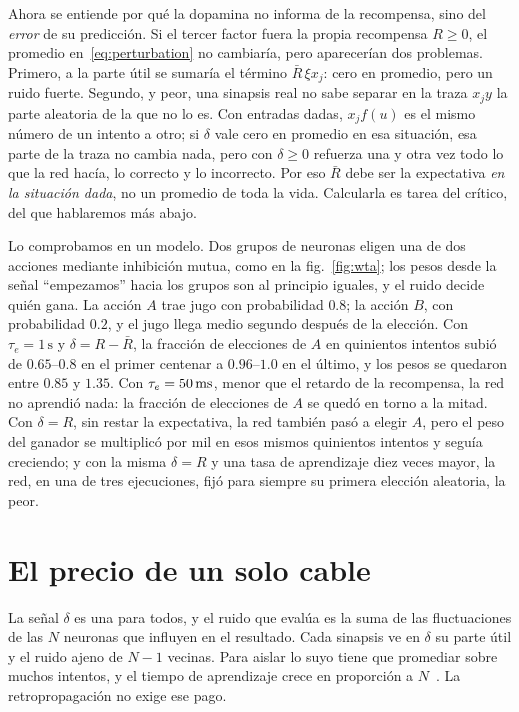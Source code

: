 Ahora se entiende por qué la dopamina no informa de la recompensa, sino del \emph{error} de su predicción. Si el tercer factor fuera la propia recompensa $R\ge0$, el promedio en~\eqref{eq:perturbation} no cambiaría, pero aparecerían dos problemas. Primero, a la parte útil se sumaría el término $\bar R\,\xi x_j$: cero en promedio, pero un ruido fuerte. Segundo, y peor, una sinapsis real no sabe separar en la traza $x_jy$ la parte aleatoria de la que no lo es. Con entradas dadas, $x_jf(u)$ es el mismo número de un intento a otro; si $\delta$ vale cero en promedio en esa situación, esa parte de la traza no cambia nada, pero con $\delta\ge0$ refuerza una y otra vez todo lo que la red hacía, lo correcto y lo incorrecto. Por eso $\bar R$ debe ser la expectativa \emph{en la situación dada}, no un promedio de toda la vida. Calcularla es tarea del crítico, del que hablaremos más abajo.

Lo comprobamos en un modelo. Dos grupos de neuronas  eligen una de dos acciones mediante inhibición mutua, como en la fig.~\ref{fig:wta}; los pesos desde la señal “empezamos” hacia los grupos son al principio iguales, y el ruido decide quién gana. La acción $A$ trae jugo con probabilidad $0.8$; la acción $B$, con probabilidad $0.2$, y el jugo llega medio segundo después de la elección. Con $\tau_e=1\,\text{s}$ y $\delta=R-\bar R$, la fracción de elecciones de $A$ en quinientos intentos subió de $0.65$--$0.8$ en el primer centenar a $0.96$--$1.0$ en el último, y los pesos se quedaron entre $0.85$ y $1.35$. Con $\tau_e=50\,\text{ms}$, menor que el retardo de la recompensa, la red no aprendió nada: la fracción de elecciones de $A$ se quedó en torno a la mitad. Con $\delta=R$, sin restar la expectativa, la red también pasó a elegir $A$, pero el peso del ganador se multiplicó por mil en esos mismos quinientos intentos y seguía creciendo; y con la misma $\delta=R$ y una tasa de aprendizaje diez veces mayor, la red, en una de tres ejecuciones, fijó para siempre su primera elección aleatoria, la peor.

\section{El precio de un solo cable}

La señal $\delta$ es una para todos, y el ruido que evalúa es la suma de las fluctuaciones de las $N$ neuronas que influyen en el resultado. Cada sinapsis ve en $\delta$ su parte útil y el ruido ajeno de $N-1$ vecinas. Para aislar lo suyo tiene que promediar sobre muchos intentos, y el tiempo de aprendizaje crece en proporción a $N$~\cite{Werfel2005}. La retropropagación no exige ese pago.

